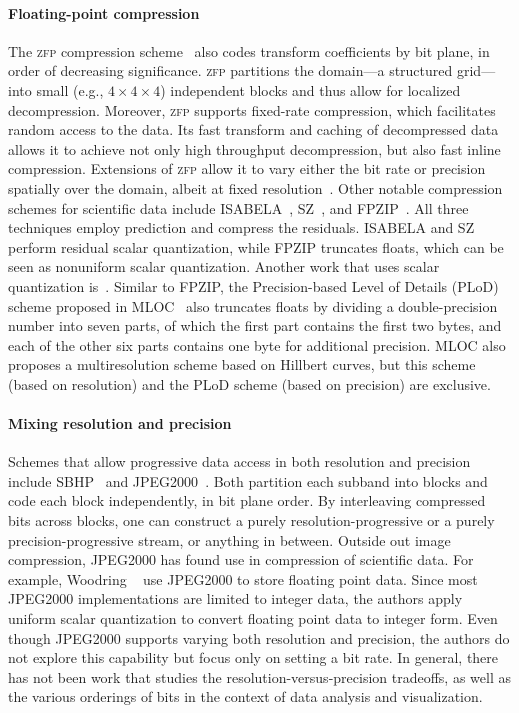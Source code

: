 \paragraph{\textbf{Floating-point compression}}
\newcommand{\zfp}{\textsc{zfp}\xspace}
The \zfp compression scheme~\cite{zfp2014} also codes transform coefficients by bit plane, in order
of decreasing significance. \zfp partitions the domain---a structured grid---into small (e.g., $4
\times 4 \times 4$) independent blocks and thus allow for localized decompression. Moreover, \zfp
supports fixed-rate compression, which facilitates random access to the data. Its fast transform and
caching of decompressed data allows it to achieve not only high throughput decompression, but also
fast inline compression. Extensions of \zfp allow it to vary either the bit rate or precision
spatially over the domain, albeit at fixed resolution~\cite{zfp-arc}. Other notable compression
schemes for scientific data include ISABELA~\cite{isabela}, SZ~\cite{sz}, and FPZIP~\cite{fpzip}.
All three techniques employ prediction and compress the residuals. ISABELA and SZ perform residual
scalar quantization, while FPZIP truncates floats, which can be seen as nonuniform scalar
quantization. Another work that uses scalar quantization is~\cite{sqe}. Similar to FPZIP, the
Precision-based Level of Details (PLoD) scheme proposed in MLOC~\cite{mloc} also truncates floats by
dividing a double-precision number into seven parts, of which the first part contains the first two
bytes, and each of the other six parts contains one byte for additional precision. MLOC also
proposes a multiresolution scheme based on Hillbert curves, but this scheme (based on resolution)
and the PLoD scheme (based on precision) are exclusive.

\paragraph{\textbf{Mixing resolution and precision}}
Schemes that allow progressive data access in both resolution and precision include
SBHP~\cite{sbhp2000} and JPEG2000~\cite{jpeg2000}. Both partition each subband into blocks and code
each block independently, in bit plane order. By interleaving compressed bits across blocks, one can
construct a purely resolution-progressive or a purely precision-progressive stream, or anything in
between. Outside out image compression, JPEG2000 has found use in compression of scientific data.
For example, Woodring \etal~\cite{woodring2011} use JPEG2000 to store floating point data. Since
most JPEG2000 implementations are limited to integer data, the authors apply uniform scalar
quantization to convert floating point data to integer form. Even though JPEG2000 supports varying
both resolution and precision, the authors do not explore this capability but focus only on setting
a bit rate. In general, there has not been work that studies the resolution-versus-precision
tradeoffs, as well as the various orderings of bits in the context of data analysis and
visualization.

